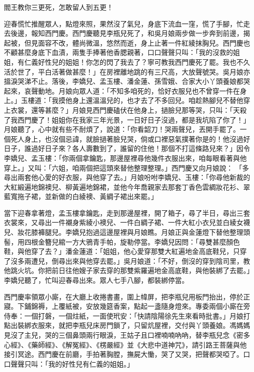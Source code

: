 閻王教你三更死，怎敢留人到五更！

迎春慌忙推醒眾人，點燈來照，果然沒了氣兒，身底下流血一窪，慌了手腳，忙走去後邊，報知西門慶。西門慶聽見李瓶兒死了，和吳月娘兩步做一步奔到前邊，揭起被，但見面容不改，體尚微溫，悠然而逝，身上止著一件紅綾抹胸兒。西門慶也不顧甚麼身底下血漬，兩隻手捧著他香腮親著，口口聲聲只叫：「我的沒救的姐姐，有仁義好性兒的姐姐！你怎的閃了我去了？寧可教我西門慶死了罷。我也不久活於世了，平白活著做甚麼！」在房裡離地跳的有三尺高，大放聲號哭。吳月娘亦搵淚哭涕不止。落後，李嬌兒、孟玉樓、潘金蓮、孫雪娥、合家大小丫頭養娘都哭起來，哀聲動地。月娘向眾人道：「不知多咱死的，恰好衣服兒也不曾穿一件在身上。」玉樓道：「我摸他身上還溫溫兒的，也才去了不多回兒。咱趁熱腳兒不替他穿上衣裳，還等甚麼？」月娘見西門慶磕伏在他身上，撾臉兒那等哭，只叫：「天殺了我西門慶了！姐姐你在我家三年光景，一日好日子沒過，都是我坑陷了你了！」月娘聽了，心中就有些不耐煩了，說道：「你看韶刀！哭兩聲兒，丟開手罷了。一個死人身上，也沒個忌諱，就臉撾著臉兒哭，倘或口裡惡氣撲著你是的！他沒過好日子，誰過好日子來？各人壽數到了，誰留的住他！那個不打這條路兒來？」因令李嬌兒、孟玉樓：「你兩個拿鑰匙，那邊屋裡尋他幾件衣服出來，咱每眼看著與他穿上。」又叫：「六姐，咱兩個把這頭來替他整理整理。」西門慶又向月娘說： 「多尋出兩套他心愛的好衣服，與他穿了去。」月娘吩咐李嬌兒、玉樓：「你尋他新裁的大紅緞遍地錦襖兒、柳黃遍地錦裙，並他今年喬親家去那套丁香色雲綢妝花衫、翠藍寬拖子裙，並新做的白綾襖、黃綢子裙出來罷。」

當下迎春拿著燈，孟玉樓拿鑰匙，走到那邊屋裡，開了箱子，尋了半日，尋出三套衣裳來，又尋出一件襯身紫綾小襖兒、一件白綢子裙、一件大紅小衣兒並白綾女襪兒、妝花膝褲腿兒。李嬌兒抱過這邊屋裡與月娘瞧。月娘正與金蓮燈下替他整理頭髻，用四根金簪兒綰一方大鴉青手帕，旋勒停當。李嬌兒因問：「尋雙甚麼顏色鞋，與他穿了去？」潘金蓮道：「姐姐，他心愛穿那雙大紅遍地金高底鞋兒，只穿了沒多兩遭兒，倒尋出來與他穿去罷。」吳月娘道：「不好，倒沒的穿到陰司里，教他跳火坑。你把前日往他嫂子家去穿的那雙紫羅遍地金高底鞋，與他裝綁了去罷。」李嬌兒聽了，忙叫迎春尋出來。眾人七手八腳，都裝綁停當。

西門慶率領眾小廝，在大廳上收捲書畫，圍上幃屏，把李瓶兒用板門抬出，停於正寢。下鋪錦褥，上覆紙被，安放幾筵香案，點起一盞隨身燈來。專委兩個小廝在旁侍奉：一個打磐，一個炷紙，一面使玳安：「快請陰陽徐先生來看時批書。」月娘打點出裝綁衣服來，就把李瓶兒床房門鎖了，只留炕屋裡，交付與丫頭養娘。馮媽媽見沒了主兒，哭的三個鼻頭兩行眼淚，王姑子且口裡喃喃吶吶，替李瓶兒念《密多心經》、《藥師經》、《解冤經》、《楞嚴經》並《大悲中道神咒》，請引路王菩薩與他接引冥途。西門慶在前廳，手拍著胸膛，撫屍大慟，哭了又哭，把聲都哭啞了。口口聲聲只叫：「我的好性兒有仁義的姐姐。」

